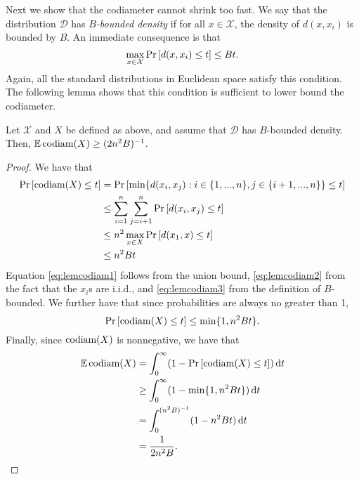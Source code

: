 \documentclass[../main.tex]{subfiles}
\newcommand{\set}[1]{\mathcal {#1}}
\newcommand{\distribution}[1]{\mathcal {#1}}
\newcommand{\dist}[2]{\distf({#1},{#2})}
\newcommand{\distf}{d}
\newcommand{\codiam}[1]{\textnormal{codiam}({#1})}
\begin{document}
Next we show that the codiameter cannot shrink too fast.
We say that the distribution $\distribution D$ has \emph{$B$-bounded density} if
for all $x\in\set X$, the density of $\dist{x}{x_i}$ is bounded by $B$.
An immediate consequence is that 
\begin{equation}
    \max_{x\in\set X} \prob{\dist{x}{x_i} \le t} \le Bt
    .
\end{equation}
Again, all the standard distributions in Euclidean space satisfy this condition.
The following lemma shows that this condition is sufficient to lower bound the codiameter.

\begin{lemma}
    \label{lemma:Ecodiam}
    Let $\set X$ and $X$ be defined as above,
    and assume that $\distribution D$ has $B$-bounded density.
    Then, $\E\codiam{X} \ge (2n^2B)^{-1}$.
\end{lemma}
\begin{proof}
    We have that
    \begin{align}
        \prob{\codiam{X} \le t}
        &=
        \prob{\min \{ \dist{x_i}{x_j} : i\in\{1,...,n\}, j\in\{i+1,...,n\} \} \le t}
        \\ &\le 
        \sum_{i=1}^n\sum_{j=i+1}^n \prob{\dist{x_i}{x_j} \le t}
        \label{eq:lemcodiam1}
        \\ & \le
        n^2 \max_{x\in X} \prob{\dist{x_1}{x} \le t}
        \label{eq:lemcodiam2}
        \\ & \le 
        n^2 B t
        \label{eq:lemcodiam3}
    \end{align}
    Equation \eqref{eq:lemcodiam1} follows from the union bound,
    \eqref{eq:lemcodiam2} from the fact that the $x_i$s are i.i.d.,
    and \eqref{eq:lemcodiam3} from the definition of $B$-bounded.
    We further have that since probabilities are always no greater than 1,
    \begin{equation}
        \prob{\codiam{X}\le t} \le \min\{1,n^2Bt\}
        .
    \end{equation}
    Finally, since $\codiam{X}$ is nonnegative, we have that 
    \begin{align}
        \E \codiam{X}
        &=
        \int_0^\infty (1-\prob{\codiam{X} \le t}) \dd t
        \\ & \ge
        \int_0^\infty (1-\min\{1,n^2 Bt\}) \dd t
        \\ & = 
        \int_0^{(n^2B)^{-1}} (1 - n^2 Bt) \dd t
        \\ & =
        \frac{1}{2n^2B}
        \label{eq:Ecodiamproof}
        .
    \end{align}
\end{proof}
\end{document}
